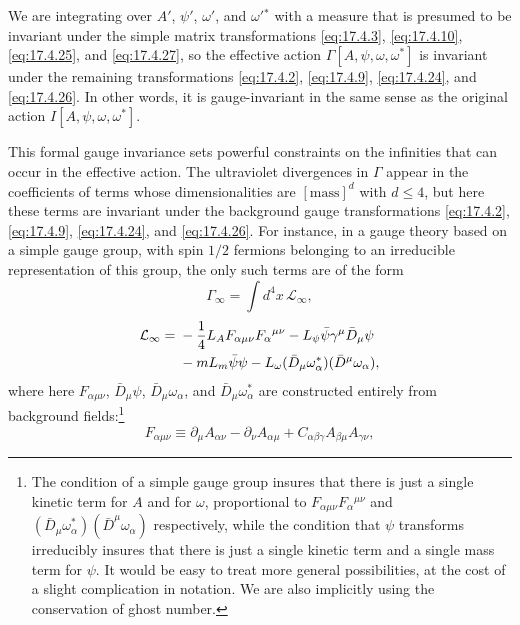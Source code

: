 We are integrating over $A'$, $\psi'$, $\omega'$, and $\omega'{}^*$ with a
measure that is presumed to be invariant under the simple matrix
transformations \eqref{eq:17.4.3}, \eqref{eq:17.4.10},
\eqref{eq:17.4.25}, and \eqref{eq:17.4.27}, so the effective action
$\Gamma[A,\psi,\omega,\omega^*]$ is invariant under the remaining
transformations \eqref{eq:17.4.2}, \eqref{eq:17.4.9},
\eqref{eq:17.4.24}, and \eqref{eq:17.4.26}. In other words, it is
gauge-invariant in the same sense as the original action
$I[A,\psi,\omega,\omega^*]$.

This formal gauge invariance sets powerful constraints on the infinities
that can occur in the effective action. The ultraviolet divergences in
$\Gamma$ appear in the coefficients of terms whose dimensionalities are
$[\mathrm{mass}]^d$ with $d\leq4$, but here these terms are invariant under
the background gauge transformations \eqref{eq:17.4.2},
\eqref{eq:17.4.9}, \eqref{eq:17.4.24}, and \eqref{eq:17.4.26}. For
instance, in a gauge theory based on a simple gauge group, with spin $1/2$
fermions belonging to an irreducible representation of this group, the only
such terms are of the form
\begin{equation}
\Gamma_\infty=\int d^4x\,\mathcal L_\infty,
\label{eq:17.4.29}
\end{equation}
\begin{align}
\mathcal L_\infty={}&-\frac14L_A F_{\alpha\mu\nu}F_\alpha{}^{\mu\nu}
-L_\psi\bar\psi\gamma^\mu\bar D_\mu\psi \notag\\
&-mL_m\bar\psi\psi
-L_\omega(\bar D_\mu\omega_\alpha^*)(\bar D^\mu\omega_\alpha),
\label{eq:17.4.30}
\end{align}
where here $F_{\alpha\mu\nu}$, $\bar D_\mu\psi$,
$\bar D_\mu\omega_\alpha$, and $\bar D_\mu\omega_\alpha^*$ are constructed
entirely from background fields:\footnote{The condition of a simple gauge group insures that there is just a single kinetic term for $A$ and for $\omega$, proportional to $F_{\alpha\mu\nu}F_\alpha{}^{\mu\nu}$ and $(\bar D_\mu\omega_\alpha^*)(\bar D^\mu\omega_\alpha)$ respectively, while the condition that $\psi$ transforms irreducibly insures that there is just a single kinetic term and a single mass term for $\psi$. It would be easy to treat more general possibilities, at the cost of a slight complication in notation. We are also implicitly using the conservation of ghost number.}
\begin{equation}
F_{\alpha\mu\nu}\equiv
\partial_\mu A_{\alpha\nu}-\partial_\nu A_{\alpha\mu}
+C_{\alpha\beta\gamma}A_{\beta\mu}A_{\gamma\nu},
\label{eq:17.4.31}
\end{equation}
